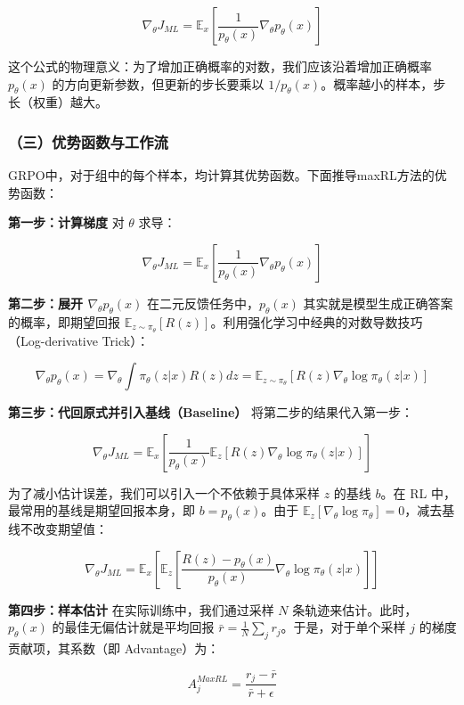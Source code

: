 \[
\nabla_\theta J_{ML}=\mathbb{E}_x\left[\frac{1}{p_\theta(x)}\nabla_\theta p_\theta(x)\right]
\]

这个公式的物理意义：为了增加正确概率的对数，我们应该沿着增加正确概率 \(p_\theta(x)\) 的方向更新参数，但更新的步长要乘以 \(1/p_\theta(x)\)。概率越小的样本，步长（权重）越大。

\hypertarget{ux4e09ux4f18ux52bfux51fdux6570ux4e0eux5de5ux4f5cux6d41}{%
\subsubsection{（三）优势函数与工作流}\label{ux4e09ux4f18ux52bfux51fdux6570ux4e0eux5de5ux4f5cux6d41}}

GRPO中，对于组中的每个样本，均计算其优势函数。下面推导maxRL方法的优势函数：

\textbf{第一步：计算梯度} 对 \(\theta\) 求导：

\[
\nabla_\theta J_{ML}=\mathbb{E}_x\left[\frac{1}{p_\theta(x)}\nabla_\theta p_\theta(x)\right]
\]

\textbf{第二步：展开 \(\nabla_\theta p_\theta(x)\)} 在二元反馈任务中，\(p_\theta(x)\) 其实就是模型生成正确答案的概率，即期望回报 \(\mathbb{E}_{z\sim\pi_\theta}[R(z)]\)。利用强化学习中经典的对数导数技巧（Log-derivative Trick）：

\[
\nabla_\theta p_\theta(x)=\nabla_\theta\int \pi_\theta(z|x)R(z)dz
=\mathbb{E}_{z\sim\pi_\theta}\left[R(z)\nabla_\theta\log \pi_\theta(z|x)\right]
\]

\textbf{第三步：代回原式并引入基线（Baseline）} 将第二步的结果代入第一步：

\[
\nabla_\theta J_{ML}=\mathbb{E}_x\left[\frac{1}{p_\theta(x)}\mathbb{E}_z\left[R(z)\nabla_\theta\log \pi_\theta(z|x)\right]\right]
\]

为了减小估计误差，我们可以引入一个不依赖于具体采样 \(z\) 的基线 \(b\)。在 RL 中，最常用的基线是期望回报本身，即 \(b=p_\theta(x)\)。由于 \(\mathbb{E}_z[\nabla_\theta\log\pi_\theta]=0\)，减去基线不改变期望值：

\[
\nabla_\theta J_{ML}=\mathbb{E}_x\left[\mathbb{E}_z\left[\frac{R(z)-p_\theta(x)}{p_\theta(x)}\nabla_\theta\log\pi_\theta(z|x)\right]\right]
\]

\textbf{第四步：样本估计} 在实际训练中，我们通过采样 \(N\) 条轨迹来估计。此时，\(p_\theta(x)\) 的最佳无偏估计就是平均回报 \(\bar{r}=\frac{1}{N}\sum_j r_j\)。于是，对于单个采样 \(j\) 的梯度贡献项，其系数（即 Advantage）为：

\[
A_j^{MaxRL}=\frac{r_j-\bar{r}}{\bar{r}+\epsilon}
\]

